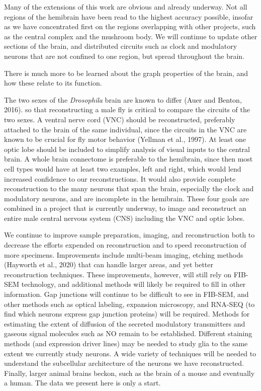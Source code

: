 \documentclass{article}
\begin{document}
Many of the extensions of this work are obvious and already underway. Not all regions of the hemibrain have been read to the highest accuracy possible, insofar as we have concentrated first on the regions overlapping with other projects, such as the central complex and the mushroom body. We will continue to update other sections of the brain, and distributed circuits such as clock and modulatory neurons that are not confined to one region, but spread throughout the brain.

There is much more to be learned about the graph properties of the brain, and how these relate to its function.


The two sexes of the \emph{Drosophila} brain are known to differ (Auer and Benton, 2016). so that reconstructing a male fly is critical to compare the circuits of the two sexes. A ventral nerve cord (VNC) should be reconstructed, preferably attached to the brain of the same individual, since the circuits in the VNC are known to be crucial for fly motor behavior (Yellman et al., 1997). At least one optic lobe should be included to simplify analysis of visual inputs to the central brain. A whole brain connectome is preferable to the hemibrain, since then most cell types would have at least two examples, left and right, which would lend increased confidence to our reconstructions. It would also provide complete reconstruction to the many neurons that span the brain, especially the clock and modulatory neurons, and are incomplete in the hemibrain. These four goals are combined in a project that is currently underway, to image and reconstruct an entire male central nervous system (CNS) including the VNC and optic lobes.

We continue to improve sample preparation, imaging, and reconstruction both to decrease the efforts expended on reconstruction and to speed reconstruction of more specimens. Improvements include multi-beam imaging, etching methods (Hayworth et al., 2020) that can handle larger areas, and yet better reconstruction techniques. These improvements, however, will still rely on FIB-SEM technology, and additional methods will likely be required to fill in other information. Gap junctions will continue to be difficult to see in FIB-SEM, and other methods such as optical labeling, expansion microscopy, and RNA-SEQ (to find which neurons express gap junction proteins) will be required. Methods for estimating the extent of diffusion of the secreted modulatory transmitters and gaseous signal molecules such as NO remain to be established. Different staining methods (and expression driver lines) may be needed to study glia to the same extent we currently study neurons. A wide variety of techniques will be needed to understand the subcellular architecture of the neurons we have reconstructed. Finally, larger animal brains beckon, such as the brain of a mouse and eventually a human. The data we present here is only a start.
\end{document}
